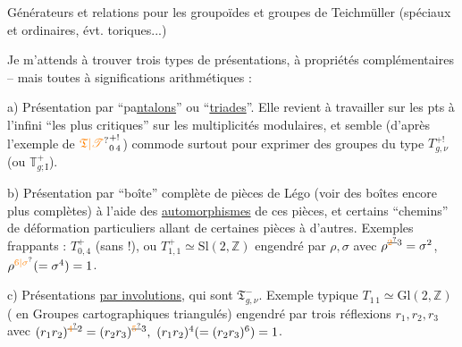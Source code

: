 Générateurs et relations pour les groupoïdes et groupes de Teichmüller (spéciaux et ordinaires, évt. toriques...)

Je m'attends à trouver trois types de présentations, à propriétés complémentaires -- mais toutes à significations arithmétiques :

a) Présentation par ``pa\uline{ntalons}'' ou ``\uline{triades}''. Elle revient à travailler sur les pts à l'infini ``les plus critiques'' sur les multiplicités modulaires, et semble (d'après l'exemple de $\unsure{\mathfrak T|\mathscr T}_{0\,4}^{+!}$) commode surtout pour exprimer des groupes du type $T_{g,\nu}^{+!}$ (ou $\mathbb T_{g;\mathrm I}^{+}$).

b) Présentation par ``boîte'' complète de pièces de Légo (voir des boîtes encore plus complètes) à l'aide des \uline{automorphismes}  de ces pièces, et certains ``chemins'' de déformation particuliers allant de certaines pièces à d'autres. Exemples frappants : $T_{0,4}^+$ (sans !), ou $T_{1,1}^+\simeq\mathrm{Sl}(2,\mathbb Z)$ engendré par $\rho,\sigma$ avec $\rho^{\deleted{\unsure{2}}3}=\sigma^2$, $\rho^{\unsure{6|\sigma}}(=\sigma^4)=1$.

c) Présentations \uline{par involutions}, qui sont  $\mathfrak T_{g,\nu}^{-}$. Exemple typique $T_{1\,1}\simeq\mathrm{Gl}(2,\mathbb Z)$  ( en Groupes cartographiques triangulés) engendré par trois réflexions $r_1,r_2,r_3$ avec $(r_1r_2)^{\deleted{\unsure{4}}2}=(r_2r_3)^{\deleted{\unsure{5}}3},\ (r_1r_2)^4(=(r_2r_3)^6)=1$.




